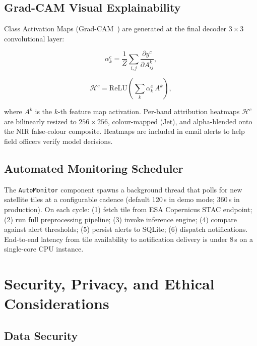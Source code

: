 \documentclass[10pt,conference]{IEEEtran}
\begin{document}
\subsection{Grad-CAM Visual Explainability}

Class Activation Maps (Grad-CAM~\cite{selvaraju2017gradcam}) are generated at
the final decoder $3{\times}3$ convolutional layer:

\begin{equation}
  \alpha_k^c = \frac{1}{Z}\sum_{i,j}
               \frac{\partial y^c}{\partial A^k_{ij}},
  \label{eq:gcam_alpha}
\end{equation}

\begin{equation}
  \mathcal{H}^c = \mathrm{ReLU}\!\left(\sum_k \alpha_k^c\, A^k\right),
  \label{eq:gcam_map}
\end{equation}

\noindent where $A^k$ is the $k$-th feature map activation. Per-band attribution
heatmaps $\mathcal{H}^c$ are bilinearly resized to $256{\times}256$, colour-mapped
(Jet), and alpha-blended onto the NIR false-colour composite. Heatmaps are
included in email alerts to help field officers verify model decisions.

\subsection{Automated Monitoring Scheduler}

The \texttt{AutoMonitor} component spawns a background thread that polls for
new satellite tiles at a configurable cadence (default 120\,s in demo mode;
360\,s in production). On each cycle: (1) fetch tile from ESA Copernicus STAC
endpoint; (2) run full preprocessing pipeline; (3) invoke inference engine;
(4) compare against alert thresholds; (5) persist alerts to SQLite; (6)
dispatch notifications. End-to-end latency from tile availability to notification
delivery is under 8\,s on a single-core CPU instance.

\section{Security, Privacy, and Ethical Considerations}
\label{sec:ethics}

\subsection{Data Security}
\end{document}
